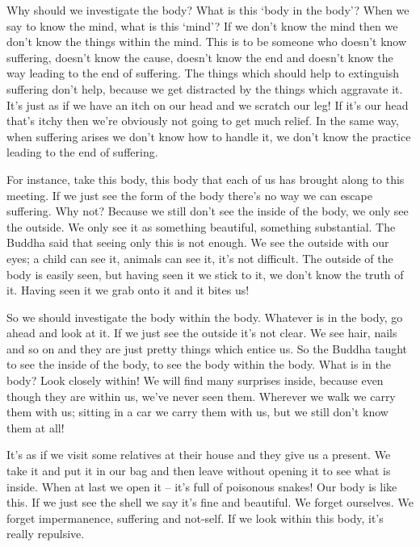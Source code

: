 Why should we investigate the body? What is this `body in the body'? When we say to know the mind, what is this `mind'? If we don't know the mind then we don't know the things within the mind. This is to be someone who doesn't know suffering, doesn't know the cause, doesn't know the end and doesn't know the way leading to the end of suffering. The things which should help to extinguish suffering don't help, because we get distracted by the things which aggravate it. It's just as if we have an itch on our head and we scratch our leg! If it's our head that's itchy then we're obviously not going to get much relief. In the same way, when suffering arises we don't know how to handle it, we don't know the practice leading to the end of suffering. 

For instance, take this body, this body that each of us has brought along to this meeting. If we just see the form of the body there's no way we can escape suffering. Why not? Because we still don't see the inside of the body, we only see the outside. We only see it as something beautiful, something substantial. The Buddha said that seeing only this is not enough. We see the outside with our eyes; a child can see it, animals can see it, it's not difficult. The outside of the body is easily seen, but having seen it we stick to it, we don't know the truth of it. Having seen it we grab onto it and it bites us! 

So we should investigate the body within the body. Whatever is in the body, go ahead and look at it. If we just see the outside it's not clear. We see hair, nails and so on and they are just pretty things which entice us. So the Buddha taught to see the inside of the body, to see the body within the body. What is in the body? Look closely within! We will find many surprises inside, because even though they are within us, we've never seen them. Wherever we walk we carry them with us; sitting in a car we carry them with us, but we still don't know them at all! 

It's as if we visit some relatives at their house and they give us a present. We take it and put it in our bag and then leave without opening it to see what is inside. When at last we open it -- it's full of poisonous snakes! Our body is like this. If we just see the shell we say it's fine and beautiful. We forget ourselves. We forget impermanence, suffering and not-self. If we look within this body, it's really repulsive. 

